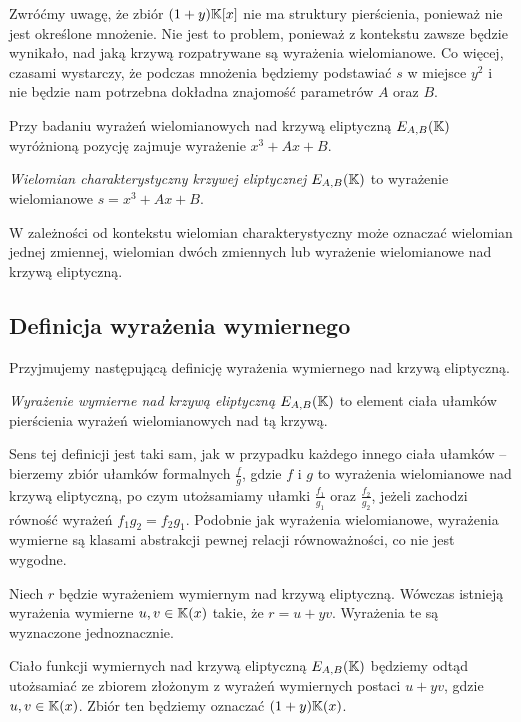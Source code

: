 Zwróćmy uwagę, że zbiór $(1 + y)\mathbb{K}[x]$ nie ma struktury pierścienia,
ponieważ nie jest określone mnożenie.
Nie jest to problem,
ponieważ z kontekstu zawsze będzie wynikało,
nad jaką krzywą rozpatrywane są wyrażenia wielomianowe.
Co więcej, czasami wystarczy,
że podczas mnożenia będziemy podstawiać $s$ w miejsce $y^2$
i nie będzie nam potrzebna dokładna znajomość parametrów $A$ oraz $B$.

Przy badaniu wyrażeń wielomianowych nad krzywą eliptyczną $E_{A,B}(\mathbb{K})$
wyróżnioną pozycję zajmuje wyrażenie $x^3 + Ax + B$.

\begin{definition}
\emph{Wielomian charakterystyczny krzywej eliptycznej $E_{A,B}(\mathbb{K})$}
to wyrażenie wielomianowe $s = x^3 + Ax + B$.
\end{definition}

W zależności od kontekstu wielomian charakterystyczny
może oznaczać wielomian jednej zmiennej, wielomian dwóch zmiennych
lub wyrażenie wielomianowe nad krzywą eliptyczną.

\subsection*{Definicja wyrażenia wymiernego}

Przyjmujemy następującą definicję
wyrażenia wymiernego nad krzywą eliptyczną.

\begin{definition}
\emph{Wyrażenie wymierne nad krzywą eliptyczną $E_{A,B}(\mathbb{K})$}
to element ciała ułamków pierścienia wyrażeń wielomianowych nad tą krzywą.
\end{definition}

Sens tej definicji jest taki sam,
jak w przypadku każdego innego ciała ułamków --
bierzemy zbiór ułamków formalnych $\frac{f}{g}$,
gdzie $f$ i $g$ to wyrażenia wielomianowe nad krzywą eliptyczną,
po czym utożsamiamy ułamki $\frac{f_1}{g_1}$ oraz $\frac{f_2}{g_2}$,
jeżeli zachodzi równość wyrażeń $f_1g_2 = f_2g_1$.
Podobnie jak wyrażenia wielomianowe,
wyrażenia wymierne są klasami abstrakcji pewnej relacji równoważności,
co nie jest wygodne.

\begin{lemma}
Niech $r$ będzie wyrażeniem wymiernym nad krzywą eliptyczną.
Wówczas istnieją wyrażenia wymierne $u, v \in \mathbb{K}(x)$ takie,
że $r = u + yv$.
Wyrażenia te są wyznaczone jednoznacznie.
\end{lemma}

\begin{remark}
Ciało funkcji wymiernych nad krzywą eliptyczną $E_{A,B}(\mathbb{K})$
będziemy odtąd utożsamiać ze zbiorem
złożonym z wyrażeń wymiernych postaci $u + yv$,
gdzie $u,v \in \mathbb{K}(x)$.
Zbiór ten będziemy oznaczać $(1 + y)\mathbb{K}(x)$.
\end{remark}

